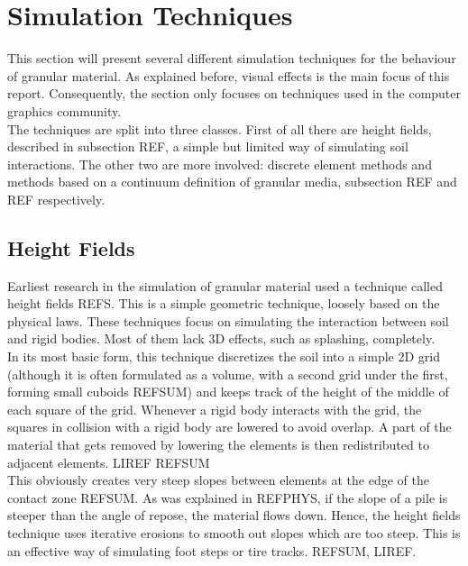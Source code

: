 \ifx\isEmbedded\undefined

\graphicspath{{../img/}}

\tableofcontents
\pagebreak

\fi

\section{Simulation Techniques} \label{sec_tech}
This section will present several different simulation techniques for the behaviour of granular material. As explained before, visual effects is the main focus of this report. Consequently, the section only focuses on techniques used in the computer graphics community.\\

The techniques are split into three classes. First of all there are height fields, described in subsection REF, a simple but limited way of simulating soil interactions. The other two are more involved: discrete element methods and methods based on a continuum definition of granular media, subsection REF and REF respectively.\\

\subsection{Height Fields}
Earliest research in the simulation of granular material used a technique called height fields REFS. This is a simple geometric technique, loosely based on the physical laws. These techniques focus on simulating the interaction between soil and rigid bodies. Most of them lack 3D effects, such as splashing, completely.\\

In its most basic form, this technique discretizes the soil into a simple 2D grid (although it is often formulated as a volume, with a second grid under the first, forming small cuboids REFSUM) and keeps track of the height of the middle of each square of the grid. Whenever a rigid body interacts with the grid, the squares in collision with a rigid body are lowered to avoid overlap. A part of the material that gets removed by lowering the elements is then redistributed to adjacent elements. LIREF REFSUM\\

This obviously creates very steep slopes between elements at the edge of the contact zone REFSUM. As was explained in REFPHYS, if the slope of a pile is steeper than the angle of repose, the material flows down. Hence, the height fields technique uses iterative erosions to smooth out slopes which are too steep. This is an effective way of simulating foot steps or tire tracks. REFSUM, LIREF.\\

